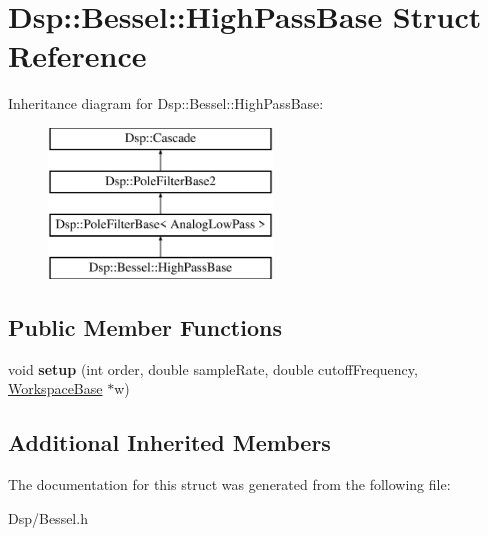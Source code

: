 \hypertarget{structDsp_1_1Bessel_1_1HighPassBase}{\section{Dsp\-:\-:Bessel\-:\-:High\-Pass\-Base Struct Reference}
\label{structDsp_1_1Bessel_1_1HighPassBase}
}
Inheritance diagram for Dsp\-:\-:Bessel\-:\-:High\-Pass\-Base\-:\begin{figure}[H]
\begin{center}
\leavevmode
\includegraphics[height=4.000000cm]{structDsp_1_1Bessel_1_1HighPassBase}
\end{center}
\end{figure}
\subsection*{Public Member Functions}
\begin{DoxyCompactItemize}
\item 
\hypertarget{structDsp_1_1Bessel_1_1HighPassBase_a5f9f86edb7a934f74789dc8bc277e0e4}{void {\bfseries setup} (int order, double sample\-Rate, double cutoff\-Frequency, \hyperlink{structDsp_1_1Bessel_1_1WorkspaceBase}{Workspace\-Base} $\ast$w)}\label{structDsp_1_1Bessel_1_1HighPassBase_a5f9f86edb7a934f74789dc8bc277e0e4}

\end{DoxyCompactItemize}
\subsection*{Additional Inherited Members}


The documentation for this struct was generated from the following file\-:\begin{DoxyCompactItemize}
\item 
Dsp/Bessel.\-h\end{DoxyCompactItemize}
